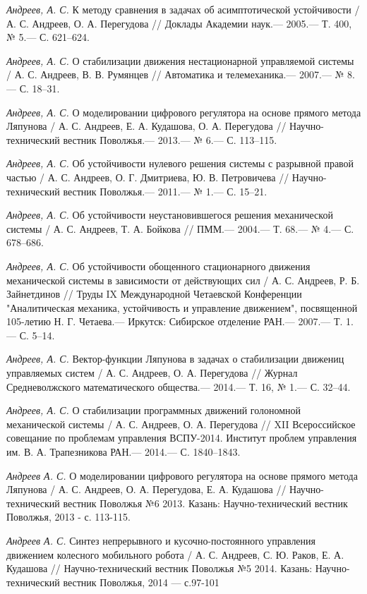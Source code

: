 \begin{thebibliography}{10}
	{\it Андреев, А. С.} К методу сравнения в задачах об асимптотической устойчивости /
	А. С. Андреев, О. А. Перегудова // Доклады Академии наук.— 2005.— Т. 400, № 5.—
	С. 621–624.
	
	{\it Андреев, А. С.} О стабилизации движения нестационарной управляемой системы /
	А. С. Андреев, В. В. Румянцев // Автоматика и телемеханика.— 2007.— № 8.—
	С. 18–31.
	
	{\it Андреев, А. С.} О моделировании цифрового регулятора на основе прямого метода Ляпунова /
	А. С. Андреев, Е. А. Кудашова, О. А. Перегудова // Научно-технический вестник Поволжья.— 2013.— № 6.—
	С. 113–115.
	
	{\it Андреев, А. С.} Об устойчивости нулевого решения системы с разрывной правой частью /
	А. С. Андреев, О. Г. Дмитриева, Ю. В. Петровичева // Научно-технический вестник Поволжья.— 2011.— № 1.—
	С. 15–21.
	
	{\it Андреев, А. С.} Об устойчивости неустановившегося решения механической системы /
	А. С. Андреев, Т. А. Бойкова // ПММ.— 2004.— Т. 68.— № 4.— С. 678–686.
	
	{\it Андреев, А. С.} Об устойчивости обощенного стационарного движения механической системы в зависимости от действующих сил /
	А. С. Андреев, Р. Б. Зайнетдинов // Труды IX Международной Четаевской Конференции "Аналитическая механика, устойчивость и управление движением", посвященной 105-летию Н. Г. Четаева.— Иркутск: Сибирское отделение РАН.— 2007.— Т. 1.— С. 5–14.
	
	{\it Андреев, А. С.} Вектор-функции Ляпунова в задачах о стабилизации движениц управляемых систем /
	А. С. Андреев, О. А. Перегудова // Журнал Средневолжского математического общества.— 2014.— Т. 16, № 1.—
	С. 32–44.
	
	{\it Андреев, А. С.} О стабилизации программных движений голономной механической системы /
	А. С. Андреев, О. А. Перегудова // XII Всероссийское совещание по проблемам управления ВСПУ-2014. Институт проблем управления им. В. А. Трапезникова РАН.— 2014.— С. 1840–1843.
	
	{\it Андреев А. С.} О моделировании цифрового регулятора на основе прямого метода Ляпунова / А. С. Андреев, О. А. Перегудова, Е. А. Кудашова //
	Научно-технический вестник Поволжья №6 2013. Казань: Научно-технический вестник Поволжья, 2013 - с. 113-115.
	
	{\it Андреев А. С.} Синтез непрерывного и кусочно-постоянного управления движением колесного мобильного робота / А. С. Андреев, С. Ю. Раков, Е. А. Кудашова  //
	Научно-технический вестник Поволжья №5 2014. Казань: Научно-технический вестник Поволжья, 2014 — с.97-101



\end{thebibliography}

